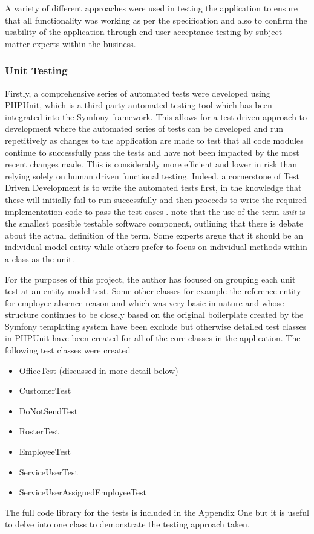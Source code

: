 \documentclass[a4paper,12pt]{article}
\begin{document}
A variety of different approaches were used in testing the application to ensure that all functionality was working as per the specification and also to confirm the usability of the application through end user acceptance testing by subject matter experts within the business.


\subsubsection {Unit Testing}

Firstly, a comprehensive series of automated tests were developed using PHPUnit, which is a third party automated testing tool which has been integrated into the Symfony framework. This allows for a test driven approach to development where the automated series of tests can be developed and run repetitively as changes to the application are made to test that all code modules continue to successfully pass the tests and have not been impacted by the most recent changes made. This is considerably more efficient and lower in risk than relying solely on human driven functional testing. Indeed, a cornerstone of Test Driven Development is to write the automated tests first, in the knowledge that these will initially fail to run successfully and then proceeds to write the required implementation code to pass the test cases \parencite{maxwilliams}.
\parencite{janzen} note that the use of the term \textit{unit} is the smallest possible testable software component, outlining that there is debate about the actual definition of the term. Some experts argue that it should be an individual model entity while others prefer to focus on individual methods within a class as the unit. 

For the purposes of this project, the author has focused on grouping each unit test at an entity model test. Some other classes for example the reference entity for employee absence reason and which was very basic in nature and whose structure continues to be closely based on the original boilerplate created by the Symfony templating system have been exclude but otherwise detailed test classes in PHPUnit have been created for all of the core classes in the application. 
The following test classes were created
\begin{itemize}
\item OfficeTest (discussed in more detail below)
\item CustomerTest
\item DoNotSendTest
\item RosterTest
\item EmployeeTest
\item ServiceUserTest
\item ServiceUserAssignedEmployeeTest
\end{itemize}
The full code library for the tests is included in the Appendix One but it is useful to delve into one class to demonstrate the testing approach taken.
\end{document}
